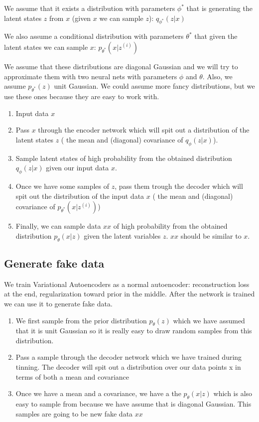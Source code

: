 We assume that it exists a distribution with parameters $\phi^*$ that is generating the latent states $z$ from $x$ (given $x$ we can sample $z$): $q_{\phi^*}(z|x)$

We also assume a conditional distribution with parameters $\theta^*$ that given the latent states we can sample $x$: $p_{\theta^*}(x|z^{(i)})$

We assume that these distributions are diagonal Gaussian and we will try to approximate them with two neural nets with parameters $\phi$ and $\theta$. Also, we assume $p_{\theta^*}(z)$ unit Gaussian. We could assume more fancy distributions, but we use these ones because they are easy to work with.

\begin{enumerate}
\item Input data $x$
\item Pass $x$ through the encoder network which will spit out a distribution of the latent states $z$ ( the mean and (diagonal) covariance of $q_{\phi}(z|x)$).
\item Sample latent states of high probability from the obtained distribution $q_{\phi}(z|x)$ given our input data $x$.
\item Once we have some samples of $z$, pass them trough the decoder which will spit out the distribution of the input data $x$ ( the mean and (diagonal) covariance of $p_{\theta^*}(x|z^{(i)})$)
\item Finally, we can sample data $xx$ of high probability from the obtained distribution $p_{\theta}(x|z)$ given the latent variables $z$. $xx$ should be similar to $x$.
\end{enumerate}

\subsection*{Generate fake data}
We train Variational Autoencoders as a normal autoencoder: reconstruction loss at the end, regularization toward prior in the middle. After the network is trained we can use it to generate fake data.

\begin{enumerate}
\item We first sample from the prior distribution $p_{\theta}(z)$ which we have assumed that it is unit Gaussian so it is really easy to draw random samples from this distribution.
\item Pass a sample through the decoder network which we have trained during tinning. The decoder will spit out a distribution over our data points x in terms of both a mean and covariance
\item Once we have a mean and a covariance, we have a the $p_{\theta}(x|z)$ which is also easy to sample from because we have assume that is diagonal Gaussian. This samples are going to be new fake data $xx$
\end{enumerate}


